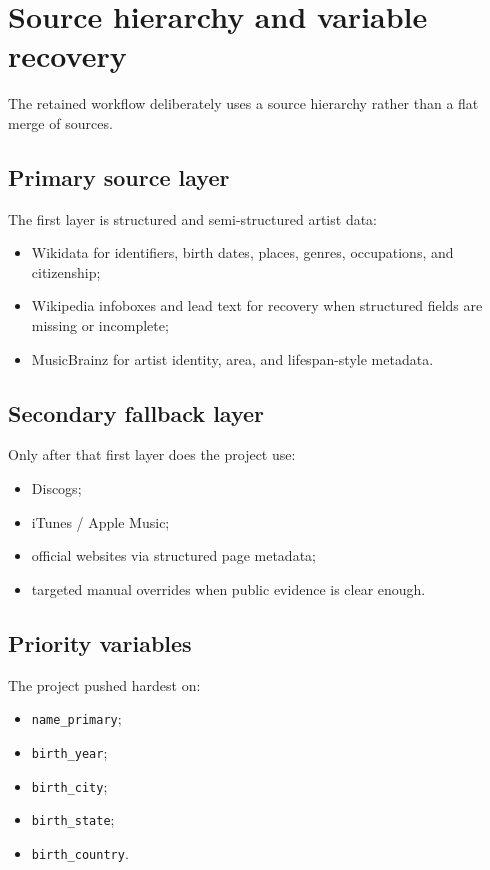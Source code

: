 \documentclass[11pt]{article}
\begin{document}
\section{Source hierarchy and variable recovery}
The retained workflow deliberately uses a source hierarchy rather than a flat
merge of sources.

\subsection{Primary source layer}
The first layer is structured and semi-structured artist data:
\begin{itemize}[leftmargin=2em]
\item Wikidata for identifiers, birth dates, places, genres, occupations, and
citizenship;
\item Wikipedia infoboxes and lead text for recovery when structured fields are
missing or incomplete;
\item MusicBrainz for artist identity, area, and lifespan-style metadata.
\end{itemize}

\subsection{Secondary fallback layer}
Only after that first layer does the project use:
\begin{itemize}[leftmargin=2em]
\item Discogs;
\item iTunes / Apple Music;
\item official websites via structured page metadata;
\item targeted manual overrides when public evidence is clear enough.
\end{itemize}

\subsection{Priority variables}
The project pushed hardest on:
\begin{itemize}[leftmargin=2em]
\item \texttt{name\_primary};
\item \texttt{birth\_year};
\item \texttt{birth\_city};
\item \texttt{birth\_state};
\item \texttt{birth\_country}.
\end{itemize}
\end{document}
